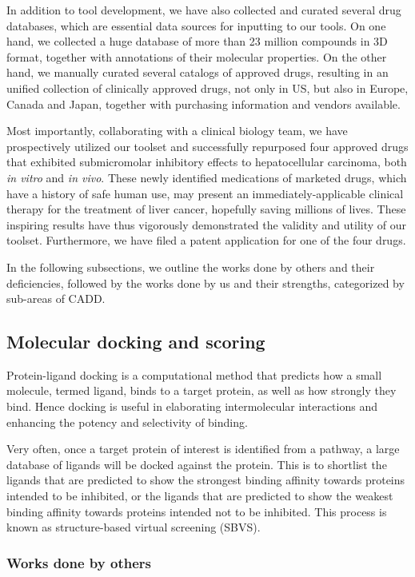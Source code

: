 \documentclass[a4paper,12pt]{article}
\begin{document}
In addition to tool development, we have also collected and curated several drug databases, which are essential data sources for inputting to our tools. On one hand, we collected a huge database of more than 23 million compounds in 3D format, together with annotations of their molecular properties. On the other hand, we manually curated several catalogs of approved drugs, resulting in an unified collection of clinically approved drugs, not only in US, but also in Europe, Canada and Japan, together with purchasing information and vendors available.

Most importantly, collaborating with a clinical biology team, we have prospectively utilized our toolset and successfully repurposed four approved drugs that exhibited submicromolar inhibitory effects to hepatocellular carcinoma, both \textit{in vitro} and \textit{in vivo}. These newly identified medications of marketed drugs, which have a history of safe human use, may present an immediately-applicable clinical therapy for the treatment of liver cancer, hopefully saving millions of lives. These inspiring results have thus vigorously demonstrated the validity and utility of our toolset. Furthermore, we have filed a patent application for one of the four drugs.

In the following subsections, we outline the works done by others and their deficiencies, followed by the works done by us and their strengths, categorized by sub-areas of CADD.

\subsection*{Molecular docking and scoring}

Protein-ligand docking is a computational method that predicts how a small molecule, termed ligand, binds to a target protein, as well as how strongly they bind. Hence docking is useful in elaborating intermolecular interactions and enhancing the potency and selectivity of binding.

Very often, once a target protein of interest is identified from a pathway, a large database of ligands will be docked against the protein. This is to shortlist the ligands that are predicted to show the strongest binding affinity towards proteins intended to be inhibited, or the ligands that are predicted to show the weakest binding affinity towards proteins intended not to be inhibited. This process is known as structure-based virtual screening (SBVS).

\subsubsection*{Works done by others}
\end{document}
